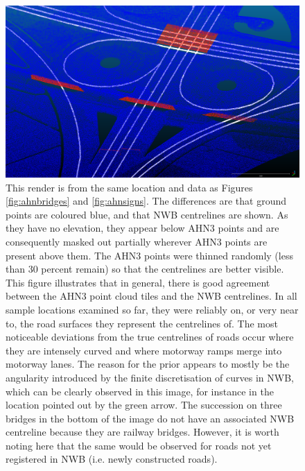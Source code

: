 \begin{figure}
    \centering
    \includegraphics[width=\linewidth]{p2/figs/ahn_sample_04.png} 
    \caption{This render is from the same location and data as Figures \ref{fig:ahnbridges} and \ref{fig:ahnsigns}. The differences are that ground points are coloured blue, and that NWB centrelines are shown. As they have no elevation, they appear below AHN3 points and are consequently masked out partially wherever AHN3 points are present above them. The AHN3 points were thinned randomly (less than 30 percent remain) so that the centrelines are better visible. This figure illustrates that in general, there is good agreement between the AHN3 point cloud tiles and the NWB centrelines. In all sample locations examined so far, they were reliably on, or very near to, the road surfaces they represent the centrelines of. The most noticeable deviations from the true centrelines of roads occur where they are intensely curved and where motorway ramps merge into motorway lanes. The reason for the prior appears to mostly be the angularity introduced by the finite discretisation of curves in NWB, which can be clearly observed in this image, for instance in the location pointed out by the green arrow. The succession on three bridges in the bottom of the image do not have an associated NWB centreline because they are railway bridges. However, it is worth noting here that the same would be observed for roads not yet registered in NWB (i.e. newly constructed roads).}
    \label{fig:ahnnwb}
\end{figure}

